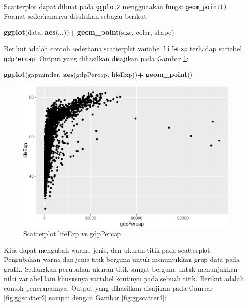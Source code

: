 \documentclass[]{book}
\newenvironment{Shaded}{\begin{snugshade}}{\end{snugshade}}
\newcommand{\KeywordTok}[1]{\textcolor[rgb]{0.13,0.29,0.53}{\textbf{#1}}}
\newcommand{\StringTok}[1]{\textcolor[rgb]{0.31,0.60,0.02}{#1}}
\newcommand{\OperatorTok}[1]{\textcolor[rgb]{0.81,0.36,0.00}{\textbf{#1}}}
\newcommand{\NormalTok}[1]{#1}
\begin{document}
Scatterplot dapat dibuat pada \texttt{ggplot2} menggunakan fungsi
\texttt{geom\_point()}. Format sederhananya dituliskan sebagai berikut:

\begin{Shaded}
\begin{Highlighting}[]
\KeywordTok{ggplot}\NormalTok{(data, }\KeywordTok{aes}\NormalTok{(...))}\OperatorTok{+}
\StringTok{  }\KeywordTok{geom_point}\NormalTok{(size, color, shape)}
\end{Highlighting}
\end{Shaded}

Berikut adalah contoh sederhana scatterplot variabel \texttt{lifeExp}
terhadap variabel \texttt{gdpPercap}. Output yang dihasilkan disajikan
pada Gambar \ref{fig:ggscatter}:

\begin{Shaded}
\begin{Highlighting}[]
\KeywordTok{ggplot}\NormalTok{(gapminder, }\KeywordTok{aes}\NormalTok{(gdpPercap, lifeExp))}\OperatorTok{+}
\StringTok{  }\KeywordTok{geom_point}\NormalTok{()}
\end{Highlighting}
\end{Shaded}

\begin{figure}

{\centering \includegraphics[width=0.7\linewidth]{EnvStat_files/figure-latex/ggscatter-1} 

}

\caption{Scatterplot lifeExp vs gdpPercap}\label{fig:ggscatter}
\end{figure}

Kita dapat mengubah warna, jenis, dan ukuran titik pada scatterplot.
Pengubahan warna dan jenis titik berguna untuk menunjukkan grup data
pada grafik. Sedangkan perubahan ukuran titik sangat berguna untuk
menunjukkan nilai variabel lain khususnya variabel kontinyu pada sebuah
titik. Berikut adalah contoh penerapannya. Output yang dihasilkan
disajikan pada Gambar \ref{fig:ggscatter2} sampai dengan Gambar
\ref{fig:ggscatter4}:
\end{document}
